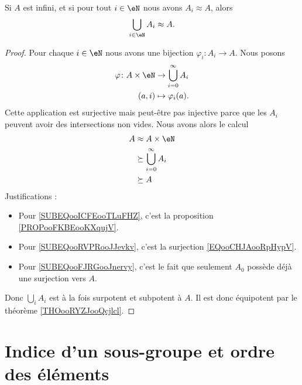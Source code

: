 \begin{lemma}       \label{LEMooNKKDooUvSYPO}
	Si \( A\) est infini, et si pour tout \( i\in \eN\) nous avons \( A_i\approx A\), alors
	\begin{equation}
		\bigcup_{i\in \eN}A_i\approx A.
	\end{equation}
\end{lemma}

\begin{proof}
	Pour chaque \( i\in \eN\) nous avons une bijection \( \varphi_i\colon A_i\to A\). Nous posons
	\begin{equation}        \label{EQooCHJAooRpHypV}
		\begin{aligned}
			\varphi\colon A\times \eN & \to \bigcup_{i=0}^{\infty}A_i \\
			(a,i)                     & \mapsto \varphi_i(a).
		\end{aligned}
	\end{equation}
	Cette application est surjective mais peut-être pas injective parce que les \( A_i\) peuvent avoir des intersections non vides. Nous avons alors le calcul
	\begin{subequations}
		\begin{align}
			A & \approx A\times \eN        \label{SUBEQooICFEooTLuFHZ}             \\
			  & \succeq \bigcup_{i=0}^{\infty}A_i      \label{SUBEQooRVPRooJJevkv} \\
			  & \succeq A      \label{SUBEQooFJRGooJnervy}
		\end{align}
	\end{subequations}
	Justifications :
	\begin{itemize}
		\item Pour \eqref{SUBEQooICFEooTLuFHZ}, c'est la proposition \ref{PROPooFKBEooKXqujV}.
		\item Pour \eqref{SUBEQooRVPRooJJevkv}, c'est la surjection \eqref{EQooCHJAooRpHypV}.
		\item Pour \eqref{SUBEQooFJRGooJnervy}, c'est le fait que seulement \( A_0\) possède déjà une surjection vers \( A\).
	\end{itemize}
	Donc \( \bigcup_iA_i\) est à la fois surpotent et subpotent à \( A\). Il est donc équipotent par le théorème \ref{THOooRYZJooQcjlcl}.
\end{proof}




\section{Indice d'un sous-groupe et ordre des éléments}

